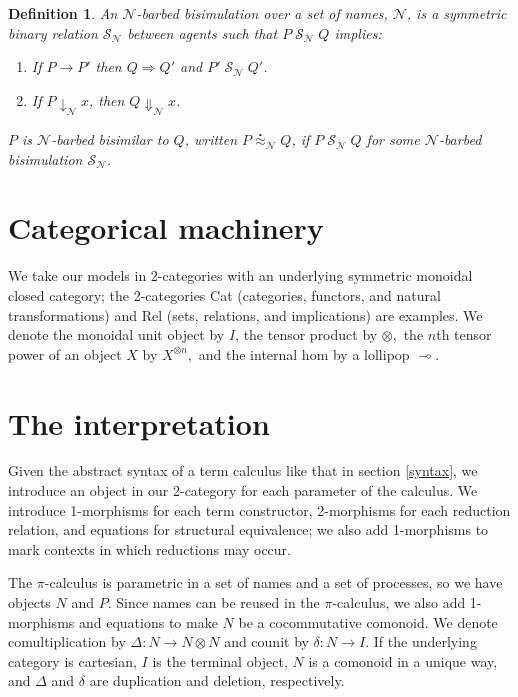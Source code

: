 \documentclass[]{acm_proc_article-sp}
\newcommand{\maps}{\colon}
\renewcommand{\red}{\rightarrow}
\newcommand{\wred}{\Rightarrow}
\newcommand{\rel}[1]{\;{\mathcal #1}\;} %
\newcommand{\wbbisim}{\stackrel{\centerdot}{\approx}} %
\newtheorem{defn}[thm]{Definition}
\numberwithin{equation}{subsection}
\newcommand{\pic}{$\pi$-calculus}
\begin{document}
\begin{defn}
An  ${\mathcal N}$-\emph{barbed bisimulation} over a set of names, ${\mathcal N}$, is a symmetric binary relation 
${\mathcal S}_{\mathcal N}$ between agents such that $P\rel{S_{\mathcal N}}Q$ implies:
\begin{enumerate}
\item If $P \red P'$ then $Q \wred Q'$ and $P'\rel{S_{\mathcal N}} Q'$.
\item If $P\downarrow_{\mathcal N} x$, then $Q\Downarrow_{\mathcal N} x$.
\end{enumerate}
$P$ is ${\mathcal N}$-barbed bisimilar to $Q$, written
$P \wbbisim_{\mathcal N} Q$, if $P \rel{S_{\mathcal N}} Q$ for some ${\mathcal N}$-barbed bisimulation ${\mathcal S}_{\mathcal N}$.
\end{defn}

\section{Categorical machinery}

We take our models in 2-categories with an underlying symmetric monoidal closed category; the 2-categories Cat (categories, functors, and natural transformations) and Rel (sets, relations, and implications) are examples.  We denote the monoidal unit object by $I$, the tensor product by $\otimes,$ the $n$th tensor power of an object $X$ by $X^{\otimes n},$ and the internal hom by a lollipop $\multimap$.

\section{The interpretation}

Given the abstract syntax of a term calculus like that in section \ref{syntax}, we introduce an object in our 2-category for each parameter of the calculus.  We introduce 1-morphisms for each term constructor, 2-morphisms for each reduction relation, and equations for structural equivalence; we also add 1-morphisms to mark contexts in which reductions may occur.

The {\pic} is parametric in a set of names and a set of processes, so we have objects $N$ and $P$.  Since names can be reused in the {\pic,} we also add 1-morphisms and equations to make $N$ be a cocommutative comonoid.  We denote comultiplication by $\Delta\maps N \to N \otimes N$ and counit by $\delta\maps N \to I.$  If the underlying category is cartesian, $I$ is the terminal object, $N$ is a comonoid in a unique way, and $\Delta$ and $\delta$ are duplication and deletion, respectively.  
\end{document}
